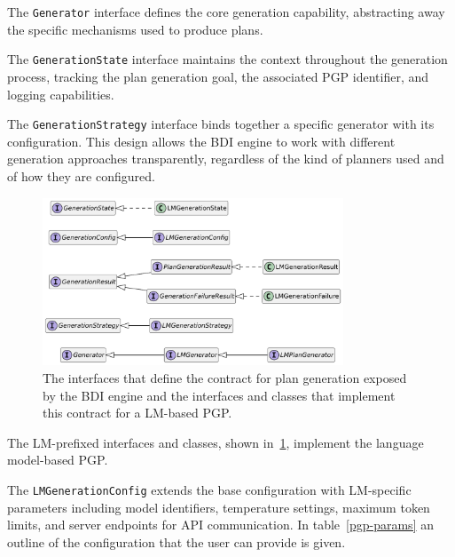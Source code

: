 \documentclass[12pt,a4paper,openright,twoside]{book}
\begin{document}
The \texttt{Generator} interface defines the core generation capability, abstracting away the specific mechanisms used to produce plans.

The \texttt{GenerationState} interface maintains the context throughout the generation process, tracking the plan generation goal, the associated \ac{PGP} identifier, and logging capabilities. 

The \texttt{GenerationStrategy} interface binds together a specific generator with its configuration. This design allows the \ac{BDI} engine to work with different generation approaches transparently, regardless of the kind of planners used and of how they are configured.

\begin{figure}
    \centering
    \includegraphics[width=0.8\textwidth]{figures/gen-interfaces.pdf}
    \caption{The interfaces that define the contract for plan generation exposed by the \ac{BDI} engine and the interfaces and classes that implement this contract for a LM-based PGP.}
    \label{fig:gen-interfaces}
\end{figure}

The LM-prefixed interfaces and classes, shown in~\cref{fig:gen-interfaces}, implement the language model-based \ac{PGP}.

The \texttt{LMGenerationConfig} extends the base configuration with LM-specific parameters including model identifiers, temperature settings, maximum token limits, and server endpoints for API communication.
%
In table~\ref{pgp-params} an outline of the configuration that the user can provide is given.
\end{document}

